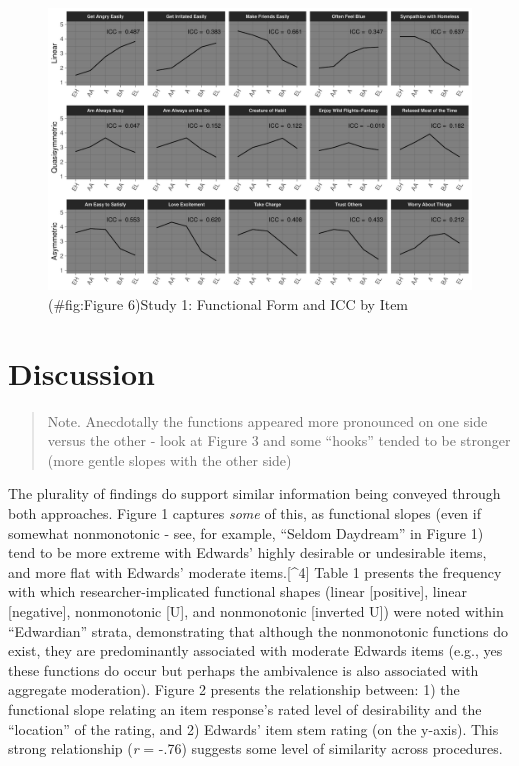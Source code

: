 \documentclass[
  ,jou]{apa6}
\begin{document}
\begin{figure}
\centering
\includegraphics{FullStudy_files/figure-latex/Figure 6-1.pdf}
\caption{(\#fig:Figure 6)Study 1: Functional Form and ICC by Item}
\end{figure}

\section{Discussion}\label{discussion}

\begin{quote}
Note. Anecdotally the functions appeared more pronounced on one side versus the other - look at Figure 3 and some ``hooks'' tended to be stronger (more gentle slopes with the other side)
\end{quote}

The plurality of findings do support similar information being conveyed through both approaches. Figure 1 captures \emph{some} of this, as functional slopes (even if somewhat nonmonotonic - see, for example, ``Seldom Daydream'' in Figure 1) tend to be more extreme with Edwards' highly desirable or undesirable items, and more flat with Edwards' moderate items.{[}\^{}4{]} Table 1 presents the frequency with which researcher-implicated functional shapes (linear {[}positive{]}, linear {[}negative{]}, nonmonotonic {[}U{]}, and nonmonotonic {[}inverted U{]}) were noted within ``Edwardian'' strata, demonstrating that although the nonmonotonic functions do exist, they are predominantly associated with moderate Edwards items (e.g., yes these functions do occur but perhaps the ambivalence is also associated with aggregate moderation). Figure 2 presents the relationship between: 1) the functional slope relating an item response's rated level of desirability and the ``location'' of the rating, and 2) Edwards' item stem rating (on the y-axis). This strong relationship (\emph{r} = -.76) suggests some level of similarity across procedures.
\end{document}

